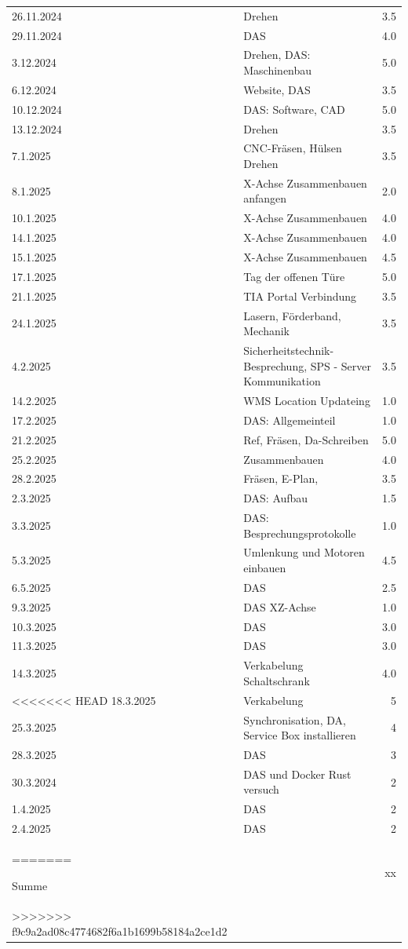 \begin{longtable}{|l|p{10cm}|r|}
26.11.2024	&Drehen& 3.5\\
29.11.2024	&DAS& 4.0\\
3.12.2024	&Drehen, DAS: Maschinenbau& 5.0\\
6.12.2024	&Website, DAS &3.5\\
10.12.2024	&DAS: Software, CAD	&5.0\\
13.12.2024	&Drehen &3.5\\
7.1.2025	&CNC-Fräsen, Hülsen Drehen&	3.5\\
8.1.2025	&X-Achse Zusammenbauen anfangen	&2.0\\
10.1.2025	&X-Achse Zusammenbauen	&4.0\\
14.1.2025	&X-Achse Zusammenbauen &	4.0\\
15.1.2025	&X-Achse Zusammenbauen &	4.5\\
17.1.2025	&Tag der offenen Türe	&5.0\\
21.1.2025	&TIA Portal Verbindung&	3.5\\
24.1.2025	&Lasern, Förderband, Mechanik	&3.5\\
4.2.2025	&Sicherheitstechnik-Besprechung, SPS - Server Kommunikation	&3.5\\
14.2.2025	&WMS Location Updateing	&1.0\\
17.2.2025	&DAS: Allgemeinteil	&1.0\\
21.2.2025	&Ref, Fräsen, Da-Schreiben	&5.0\\
25.2.2025	&Zusammenbauen&	4.0\\
28.2.2025	&Fräsen, E-Plan,&	3.5\\
2.3.2025	&DAS: Aufbau	&1.5\\
3.3.2025	&DAS: Besprechungsprotokolle&	1.0\\
5.3.2025	&Umlenkung und Motoren einbauen&	4.5\\
6.5.2025	&DAS  &	2.5\\
9.3.2025	&DAS XZ-Achse	&1.0\\
10.3.2025	&DAS	&3.0\\
11.3.2025	&DAS	&3.0\\
14.3.2025	&Verkabelung Schaltschrank	&4.0\\
<<<<<<< HEAD
18.3.2025   &Verkabelung & 5\\
25.3.2025	&Synchronisation, DA, Service Box installieren& 4\\
28.3.2025	&DAS& 3\\
30.3.2024  &DAS und Docker Rust versuch &2\\
1.4.2025& DAS &2\\
2.4.2025& DAS &2\\

=======

\hline
\hline
Summe & & xx \\
>>>>>>> f9c9a2ad08c4774682f6a1b1699b58184a2ce1d2

\end{longtable}
\newpage


